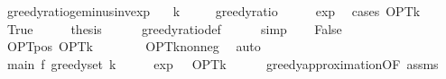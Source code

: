 \begin{isabellebody}
\isanewline
{}\isamarkupfalse%
\ greedy{\isacharunderscore}{\kern0pt}ratio{\isacharunderscore}{\kern0pt}ge{\isacharunderscore}{\kern0pt}{}{\isacharunderscore}{\kern0pt}minus{\isacharunderscore}{\kern0pt}inv{\isacharunderscore}{\kern0pt}exp{\isacharcolon}{\kern0pt}\isanewline
\ \ \ {\isachardoublequoteopen}k\ {\isachargreater}{\kern0pt}\ {}{\isachardoublequoteclose}\isanewline
\ \ \ {\isachardoublequoteopen}greedy{\isacharunderscore}{\kern0pt}ratio\ {\isasymge}\ {}\ {\isacharminus}{\kern0pt}\ {}\ {\isacharslash}{\kern0pt}\ exp\ {}{\isachardoublequoteclose}\isanewline
%
\isadelimproof
%
\endisadelimproof
%
\isatagproof
{}\isamarkupfalse%
\ {\isacharparenleft}{\kern0pt}cases\ {\isachardoublequoteopen}OPT{\isacharunderscore}{\kern0pt}k\ {\isacharequal}{\kern0pt}\ {}{\isachardoublequoteclose}{\isacharparenright}{\kern0pt}\isanewline
\ \ \isamarkupfalse%
\ True\isanewline
\ \ \isamarkupfalse%
\ \isamarkupfalse%
\ {\isacharquery}{\kern0pt}thesis\isanewline
\ \ \ \ \isamarkupfalse%
\ greedy{\isacharunderscore}{\kern0pt}ratio{\isacharunderscore}{\kern0pt}def\isanewline
\ \ \ \ \isamarkupfalse%
\ simp\isanewline
{}\isamarkupfalse%
\isanewline
\ \ \isamarkupfalse%
\ False\isanewline
\ \ \isamarkupfalse%
\ \isamarkupfalse%
\ OPT{\isacharunderscore}{\kern0pt}pos{\isacharcolon}{\kern0pt}\ {\isachardoublequoteopen}OPT{\isacharunderscore}{\kern0pt}k\ {\isachargreater}{\kern0pt}\ {}{\isachardoublequoteclose}\isanewline
\ \ \ \ \isamarkupfalse%
\ OPT{\isacharunderscore}{\kern0pt}k{\isacharunderscore}{\kern0pt}nonneg\ \isamarkupfalse%
\ auto\isanewline
\ \ \isamarkupfalse%
\ main{\isacharcolon}{\kern0pt}\ {\isachardoublequoteopen}f\ {\isacharparenleft}{\kern0pt}greedy{\isacharunderscore}{\kern0pt}set\ k{\isacharparenright}{\kern0pt}\ {\isasymge}\ {\isacharparenleft}{\kern0pt}{}\ {\isacharminus}{\kern0pt}\ {}\ {\isacharslash}{\kern0pt}\ exp\ {}{\isacharparenright}{\kern0pt}\ {\isacharasterisk}{\kern0pt}\ OPT{\isacharunderscore}{\kern0pt}k{\isachardoublequoteclose}\isanewline
\ \ \ \ \isamarkupfalse%
\ greedy{\isacharunderscore}{\kern0pt}approximation{\isacharbrackleft}{\kern0pt}OF\ assms{\isacharbrackright}{\kern0pt}\ \isakeywordONE{{\isachardot}{\kern0pt}}\isamarkupfalse%

\end{isabellebody}
